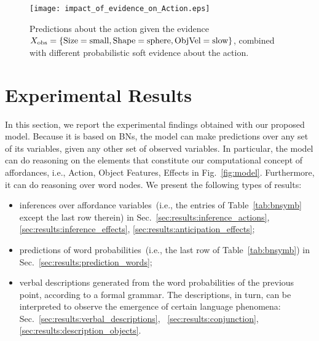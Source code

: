 
\begin{figure}
\centering
\texttt{[image: impact\_of\_evidence\_on\_Action.eps]}
\caption{Predictions about the action given the evidence $X_\text{obs} =\{\text{Size}=\text{small}, \text{Shape}=\text{sphere}, \text{ObjVel}=\text{slow}\}$, combined with different probabilistic soft evidence about the action.} %
\label{fig:impact_of_evidence_on_Action}
\end{figure}

\section{Experimental Results}
\label{sec:results}

In this section, we report the experimental findings obtained with our proposed model.
Because it is based on \aclp{BN}, the model can make predictions over any set of its variables, given any other set of observed variables.
In particular, the model can do reasoning on the elements that constitute our computational concept of affordances, i.e., Action, Object Features, Effects in Fig.~\ref{fig:model}.
Furthermore, it can do reasoning over word nodes.
We present the following types of results:
\begin{itemize}
  \item inferences over affordance variables~(i.e., the entries of Table~\ref{tab:bnsymb} except the last row therein) in Sec.~\ref{sec:results:inference_actions}, \ref{sec:results:inference_effects}, \ref{sec:results:anticipation_effects};

  \item predictions of word probabilities~(i.e., the last row of Table~\ref{tab:bnsymb}) in Sec.~\ref{sec:results:prediction_words};

  \item verbal descriptions generated from the word probabilities of the previous point, according to a formal grammar. The descriptions, in turn, can be interpreted to observe the emergence of certain language phenomena: Sec.~\ref{sec:results:verbal_descriptions}, ~\ref{sec:results:conjunction}, \ref{sec:results:description_objects}.
\end{itemize}


